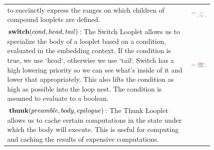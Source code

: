 \begin{figure}[ht]
\begin{tabular} {|l|c|}
\begin{minipage}[c]{0.65\linewidth}
        to succinctly express the ranges on which children of compound looplets
        are defined.
    \end{minipage} &
    \begin{minipage}[c]{0.35\linewidth}
        \centering
        \includegraphics[scale=0.20]{Looplets-phase.png}
    \end{minipage} \\
    \begin{minipage}[c]{0.65\linewidth}
        $\text{\textbf{switch}}(cond, head, tail)$: The Switch Looplet allows
        us to specialize the body of a looplet based on a condition, evaluated
        in the embedding context. If the condition is true, we use `head`,
        otherwise we use `tail`. Switch has a high lowering priority so we can
        see what's inside of it and lower that appropriately. This also lifts
        the condition as high as possible into the loop nest. The condition is
        assumed to evaluate to a boolean.
    \end{minipage} &
    \begin{minipage}[c]{0.35\linewidth}
        \centering
        \includegraphics[scale=0.20]{Looplets-switch.png}
    \end{minipage} \\
    \begin{minipage}[c]{0.65\linewidth}
        $\text{\textbf{thunk}}(preamble, body, epilogue)$: The Thunk Looplet
        allows us to cache certain computations in the state under which the
        body will execute. This is useful for computing and caching the results
        of expensive computations.
    \end{minipage} &

\end{tabular}
\end{figure}
